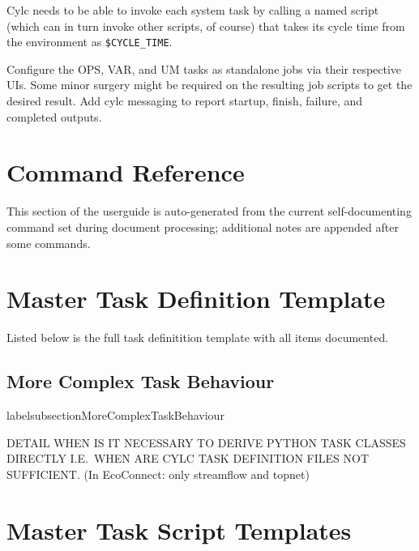 \documentclass[11pt,a4paper]{article}
\begin{document}
Cylc needs to be able to invoke each system task by calling a named
script (which can in turn invoke other scripts, of course) that takes
its cycle time from the environment as  \lstinline=$CYCLE_TIME=.

Configure the OPS, VAR, and UM tasks as standalone jobs via their
respective UIs. Some minor surgery might be required on the resulting
job scripts to get the desired result.  Add cylc messaging to report
startup, finish, failure, and completed outputs.

\pagebreak
\section{Command Reference}
\label{CommandReference}

This section of the userguide is auto-generated from the current
self-documenting command set during document processing; additional
notes are appended after some commands.

\lstset{language=usage}



\section{Master Task Definition Template}
\label{MasterTaskDefinitionTemplate}

Listed below is the full task definitition template with all items
documented.

\lstset{language=cylctaskdef}



\lstset{language=}

\pagebreak
\subsection{More Complex Task Behaviour}
labelsubsection{MoreComplexTaskBehaviour}

DETAIL WHEN IS IT NECESSARY TO DERIVE PYTHON TASK CLASSES DIRECTLY
I.E.\ WHEN ARE CYLC TASK DEFINITION FILES NOT SUFFICIENT.
(In EcoConnect: only streamflow and topnet)

\pagebreak
\section{Master Task Script Templates}
\label{MasterTaskScriptTemplates}
\end{document}
